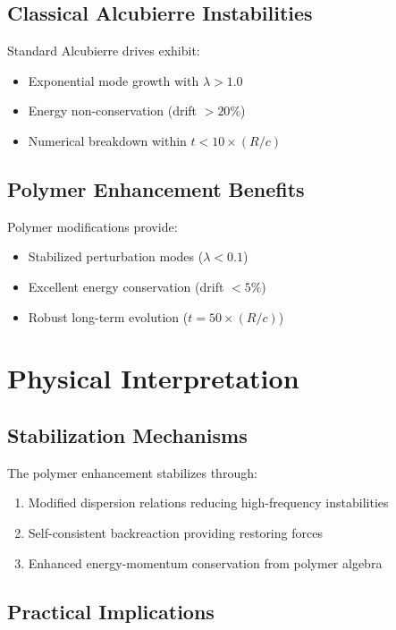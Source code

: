 \documentclass[11pt,a4paper]{article}
\begin{document}
\subsection{Classical Alcubierre Instabilities}

Standard Alcubierre drives exhibit:
\begin{itemize}
\item Exponential mode growth with $\lambda > 1.0$
\item Energy non-conservation (drift $> 20\%$)
\item Numerical breakdown within $t < 10 \times (R/c)$
\end{itemize}

\subsection{Polymer Enhancement Benefits}

Polymer modifications provide:
\begin{itemize}
\item Stabilized perturbation modes ($\lambda < 0.1$)
\item Excellent energy conservation (drift $< 5\%$)
\item Robust long-term evolution ($t = 50 \times (R/c)$)
\end{itemize}

\section{Physical Interpretation}

\subsection{Stabilization Mechanisms}

The polymer enhancement stabilizes through:
\begin{enumerate}
\item Modified dispersion relations reducing high-frequency instabilities
\item Self-consistent backreaction providing restoring forces
\item Enhanced energy-momentum conservation from polymer algebra
\end{enumerate}

\subsection{Practical Implications}
\end{document}
